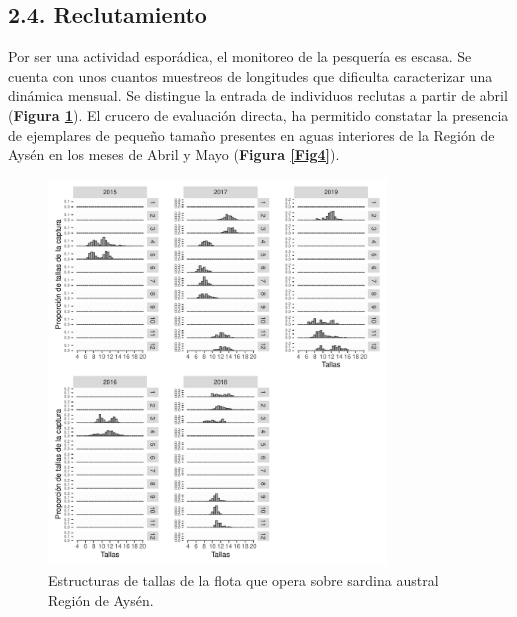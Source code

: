 \documentclass[
  spanish,
]{article}
\begin{document}
\hypertarget{reclutamiento}{%
\subsection{2.4. Reclutamiento}\label{reclutamiento}}

Por ser una actividad esporádica, el monitoreo de la pesquería es
escasa. Se cuenta con unos cuantos muestreos de longitudes que dificulta
caracterizar una dinámica mensual. Se distingue la entrada de individuos
reclutas a partir de abril (\textbf{Figura \ref{Fig3}}). El crucero de
evaluación directa, ha permitido constatar la presencia de ejemplares de
pequeño tamaño presentes en aguas interiores de la Región de Aysén en
los meses de Abril y Mayo (\textbf{Figura \ref{Fig4}}).

\begin{figure}[htb!]
\centering
\includegraphics[width=0.8\textwidth]{Figuras/Fig3_InformeFinal-1.pdf}
\caption{ Estructuras de tallas de la flota que opera sobre sardina austral Región de Aysén.}
\label{Fig3}
\end{figure}

\pagebreak
\end{document}
